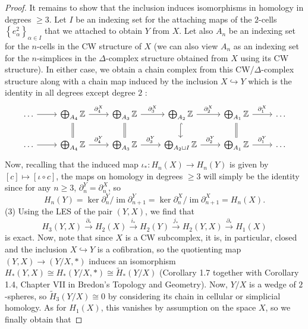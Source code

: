 \documentclass[reqno]{amsart}
\theoremstyle{definition}
\theoremstyle{remark}
\DeclareMathOperator{\im}{im}
\begin{document}
\begin{proof}
        It remains to show that the inclusion induces
        isomorphisms in homology in degrees $\ge 3$.
        Let $I$ be an indexing set
        for the attaching maps of the
         $2$-cells 
         $\left\{ e_{\alpha}^2 \right\}_{\alpha \in I}$
         that we attached to obtain $Y$ from $X$.
         Let also $A_n$ be an indexing set for
         the $n$-cells in the CW structure of $X$ (we can also view
         $A_n$ as an indexing set for the
         $n$-simplices in the $\Delta$-complex structure obtained
         from $X$ using its CW structure).
         In either case, we obtain a chain complex
         from this CW/$\Delta$-complex structure 
         along with a chain map induced
         by the inclusion $X \hookrightarrow Y$ which
         is the identity in all degrees except degree
         $2$ :
         \begin{equation*}
    \begin{tikzcd}
        \ldots \ar[r] &\bigoplus_{A_4} \mathbb{Z} \ar[r,
        "\partial_4^{X}"] \ar[d, equal] 
        & \bigoplus_{A_3} \mathbb{Z} \ar[r, "\partial_3^{X}"]
        \ar[d, equal] &
        \bigoplus_{A_2} \mathbb{Z} \ar[d, hookrightarrow] \ar[r,
        "\partial_2^{X}"] &
        \bigoplus_{A_1} \mathbb{Z} \ar[d, equal] 
        \ar[r, "\partial_1^{X}"] & \ldots \\
        \ldots \ar[r] &\bigoplus_{A_4}\mathbb{Z} \ar[r,
        "\partial_4^{Y}"]
        & \bigoplus_{A_3} \mathbb{Z} \ar[r, "\partial_3^{Y}"] &
        \bigoplus_{A_2 \sqcup I} \mathbb{Z} \ar[r, "\partial_2^{Y}"]
        & 
        \bigoplus_{A_1} \mathbb{Z} \ar[r, "\partial_1^{Y}"] & \ldots
    \end{tikzcd}
    \end{equation*}
    Now, recalling that the induced
    map  $\iota_{*} \colon
    H_n \left( X \right) \to 
    H_n (Y)$ is given by
    $\left[ c \right] \mapsto 
    \left[ \iota \circ c \right] $, 
    the maps on homology in degrees $ \ge 3$ will
    simply be the identity since
    for any $n \ge 3$, $\partial_n^{Y} = 
    \partial_n^{X}$, so
    \[
    H_n (Y) = \ker \partial_n^{Y} / \im \partial_{n+1}^{Y}
    = \ker \partial_n^{X} / \im \partial_{n+1}^{X}
    = H_n (X).
    \] 
    (3) Using the LES of the pair $\left( Y,X \right) $, we
    find that
    \[
    H_3 \left( Y,X \right) \stackrel{\partial_*}{\to} 
    H_2 \left( X \right) \stackrel{i_*}{\to} 
    H_2 (Y) \stackrel{j_*}{\to}  H_2 (Y,X) \stackrel{\partial_*}{\to} 
    H_1 \left( X \right) 
    \] 
    is exact. 
    Now, note that since $X$ is a CW subcomplex, it
    is, in particular, closed and
    the inclusion  $X \hookrightarrow Y$ is a cofibration,
    so the quotienting map
    $\left( Y,X \right) \to \left( Y / X, * \right) $ 
    induces an isomorphism
    $H_* \left( Y,X \right) \cong
    H_* \left( Y / X, * \right) \cong
    \tilde{H}_* (Y / X)$
    (Corollary 1.7 together with
    Corollary 1.4, Chapter VII in Bredon's Topology and Geometry).
    Now, $Y / X$ is a wedge of
    $2$-spheres, so 
    $\tilde{H}_3 (Y / X) \cong 0$ by considering
    its chain in cellular or simplicial homology.
    As for $H_1 (X)$, this vanishes by assumption on the
    space $X$, so we finally obtain that
    

\end{proof}
\end{document}
